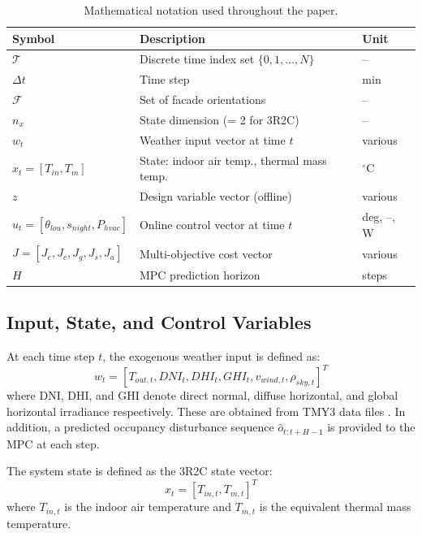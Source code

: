 \documentclass[preprint,12pt]{elsarticle}
\begin{document}
\begin{table}[htbp]
\centering
\caption{Mathematical notation used throughout the paper.}
\label{tab:notation}
\begin{tabularx}{\textwidth}{@{} l >{\raggedright\arraybackslash}X l @{}}
\toprule
\textbf{Symbol} & \textbf{Description} & \textbf{Unit} \\
\midrule
$\mathcal{T}$ & Discrete time index set $\{0,1,\ldots,N\}$ & -- \\
$\Delta t$ & Time step & min \\
$\mathcal{F}$ & Set of facade orientations & -- \\
$n_x$ & State dimension (= 2 for 3R2C) & -- \\
$w_t$ & Weather input vector at time $t$ & various \\
$x_t = [T_{in}, T_m]$ & State: indoor air temp., thermal mass temp. & $^\circ$C \\
$z$ & Design variable vector (offline) & various \\
$u_t = [\theta_{lou}, s_{night}, P_{hvac}]$ & Online control vector at time $t$ & deg, --, W \\
$J = [J_e, J_c, J_g, J_s, J_a]$ & Multi-objective cost vector & various \\
$H$ & MPC prediction horizon & steps \\
\bottomrule
\end{tabularx}
\end{table}

\subsection{Input, State, and Control Variables}

At each time step $t$, the exogenous weather input is defined as:
\begin{equation}
\label{eq:weather}
w_t = [T_{out,t}, DNI_t, DHI_t, GHI_t, v_{wind,t}, \rho_{sky,t}]^T
\end{equation}
where DNI, DHI, and GHI denote direct normal, diffuse horizontal, and global horizontal irradiance respectively. These are obtained from TMY3 data files \cite{wilcox2008}. In addition, a predicted occupancy disturbance sequence $\hat{o}_{t:t+H-1}$ is provided to the MPC at each step.

The system state is defined as the 3R2C state vector:
\begin{equation}
\label{eq:state}
x_t = [T_{in,t}, T_{m,t}]^T
\end{equation}
where $T_{in,t}$ is the indoor air temperature and $T_{m,t}$ is the equivalent thermal mass temperature.
\end{document}
